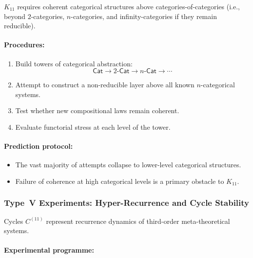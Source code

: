 $K_{11}$ requires coherent categorical structures above
categories-of-categories (i.e., beyond $2$-categories, $n$-categories,
and infinity-categories if they remain reducible).

\paragraph{Procedures:}

\begin{enumerate}
    \item Build towers of categorical abstraction:
          \[
              \mathsf{Cat}
              \rightarrow
              2\text{-}\mathsf{Cat}
              \rightarrow
              n\text{-}\mathsf{Cat}
              \rightarrow
              \cdots
          \]
    \item Attempt to construct a non-reducible layer above all
          known $n$-categorical systems.
    \item Test whether new compositional laws remain coherent.
    \item Evaluate functorial stress at each level of the tower.
\end{enumerate}

\paragraph{Prediction protocol:}

\begin{itemize}
    \item The vast majority of attempts collapse to
          lower-level categorical structures.
    \item Failure of coherence at high categorical levels is a
          primary obstacle to $K_{11}$.
\end{itemize}



\subsubsection{Type~V Experiments: Hyper-Recurrence and Cycle Stability}

Cycles $C^{(11)}$ represent recurrence dynamics of third-order
meta-theoretical systems.

\paragraph{Experimental programme:}


